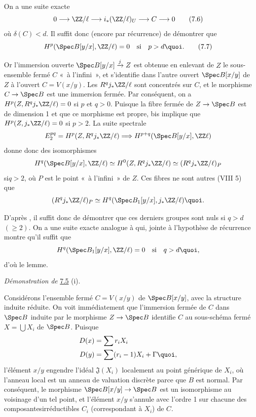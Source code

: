 \documentclass[10pt]{../fichiers-configuration-latex/smfart}
\begin{document}
On a une suite exacte
\begin{equation*}
0\longrightarrow \ZZ/\ell\longrightarrow
i_{\ast}(\ZZ/\ell)_{U}\longrightarrow C\longrightarrow 0\tag{7.6}
\end{equation*}
où $\delta(C)<d$. Il suffit donc (encore par récurrence) de démontrer
que
\begin{equation*}
H^{p}(\Spec B[y/x],\ZZ/\ell)=0\quad\text{\rm si}\quad
p>d{\quoi}.\tag{7.7}
\end{equation*}

Or l'immersion ouverte $\Spec B[y/x]\xrightarrow{j}Z$ est obtenue en
enlevant de $Z$ le sous-ensemble fermé $C$ « à l'infini », et
s'identifie dans l'autre ouvert $\Spec B[x/y]$ de $Z$ à l'ouvert
$C=V(x/y)$. Les $R^{q}j_{\ast}\ZZ/\ell$ sont concentrés sur
$C$, et le morphisme $C\rightarrow \Spec B$ est une immersion
fermée. Par conséquent, on a $H^{p}(Z,R^{q}j_{\ast}\ZZ/\ell)=0$
si $p$ et $q>0$. Puisque la fibre fermée de $Z\rightarrow \Spec B$ est
de dimension 1 et que ce morphisme est propre,  bis implique
que $H^{p}(Z,j_{\ast}\ZZ/\ell)=0$ si $p>2$. La suite spectrale
$$
E^{pq}_{2}=H^{p}(Z,R^{q}j_{\ast}\ZZ/\ell)\Longrightarrow
H^{p+q}(\Spec B[y/x],\ZZ\ell)
$$
donne donc des isomorphismes
$$
H^{q}(\Spec B[y/x],\ZZ/\ell)\simeq
H^{0}(Z,R^{q}j_{\ast}\ZZ/\ell)\simeq
(R^{q}j_{\ast}\ZZ/\ell)_{P}
$$
si\pageoriginale $q>2$, où $P$ est le point « à l'infini » de
$Z$. Ces fibres ne sont autres (VIII 5) que
$$
(R^{q}j_{\ast}\ZZ/\ell)_{P}\simeq H^{q}(\Spec
B_{1}[y/x],j_{\ast}\ZZ/\ell){\quoi}.
$$

D'après , il suffit donc de démontrer que ces derniers groupes sont
nuls si $q>d$ $(\geq 2)$. On a une suite exacte analogue à  qui,
jointe à l'hypothèse de récurrence montre qu'il suffit que
$$
H^{q}(\Spec B_{1}[y/x],\ZZ/\ell)=0\quad\mbox{\rm si}\quad
q>d{\quoi},
$$
d'où le lemme.

\medskip
\noindent
\emph{Démonstration de} \hyperref[XIX.lem7.5]{7.5} (i).

Considérons l'ensemble fermé $C=V(x/y)$ de $\Spec B[x/y]$, avec la
structure induite réduite. On voit immédiatement que l'immersion
fermée de $C$ dans $\Spec B$ induite par le morphisme $Z\rightarrow
\Spec B$ identifie $C$ au sous-schéma fermé $X=\bigcup X_{i}$ de
$\Spec B$. Puisque
\begin{align*}
D(x) &= \sum r_{i}X_{i}\\
D(y) &= \sum (r_{i}-1)X_{i}+\Gamma{\quoi},
\end{align*}
l'élément $x/y$ engendre l'idéal $\mathfrak{J}(X_{i})$ localement au
point générique de $X_{i}$, où l'anneau local est un anneau de
valuation discrète parce que $B$ est normal. Par conséquent, le
morphisme $\Spec B[x/y]\rightarrow \Spec B$ est un isomorphisme au
voisinage d'un tel point, et l'élément $x/y$ s'annule avec l'ordre 1
sur chacune des composantes\pageoriginale irréductibles $C_{i}$
(correspondant à $X_{i}$) de $C$.
\end{document}
